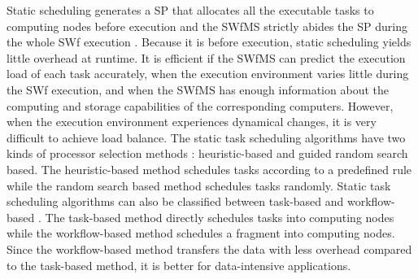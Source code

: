 Static scheduling generates a SP that allocates all the
executable tasks to computing nodes before
execution and the SWfMS strictly abides the SP during
the whole SWf execution \cite{Bux2013}.
Because it is before execution, static scheduling
yields little overhead at runtime.
It is efficient if the SWfMS can predict the execution load of each task
accurately, when the execution environment varies little during the
SWf execution, and when the SWfMS has enough information about
the computing and storage capabilities of the corresponding computers.
However, when the execution environment experiences dynamical changes,
it is very difficult to achieve load balance. 
The static task scheduling algorithms have two kinds of processor
selection methods \cite{Topcuouglu2002}: heuristic-based and guided random search based.
The heuristic-based method schedules tasks according to a predefined
rule while the random search based method schedules tasks randomly.
Static task scheduling algorithms can also be classified between
task-based and workflow-based \cite{Blythe2005}. The task-based
method directly schedules tasks into computing nodes while the
workflow-based method schedules a fragment into computing nodes.
Since the workflow-based method transfers the data with less overhead compared to the task-based method,
it is better for data-intensive applications. 

